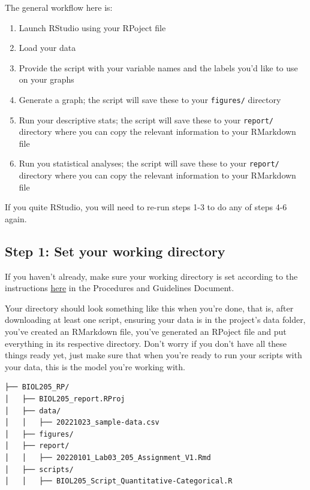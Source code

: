 \documentclass[
]{book}
\providecommand{\tightlist}{%
  \setlength{\itemsep}{0pt}\setlength{\parskip}{0pt}}
\begin{document}
The general workflow here is:

\begin{enumerate}
\def\labelenumi{\arabic{enumi}.}
\tightlist
\item
  Launch RStudio using your RPoject file
\item
  Load your data
\item
  Provide the script with your variable names and the labels you'd like to use on your graphs
\item
  Generate a graph; the script will save these to your \texttt{figures/} directory
\item
  Run your descriptive stats; the script will save these to your \texttt{report/} directory where you can copy the relevant information to your RMarkdown file
\item
  Run you statistical analyses; the script will save these to your \texttt{report/} directory where you can copy the relevant information to your RMarkdown file
\end{enumerate}

If you quite RStudio, you will need to re-run steps 1-3 to do any of steps 4-6 again.

\hypertarget{step-1-set-your-working-directory}{%
\subsection*{Step 1: Set your working directory}\label{step-1-set-your-working-directory}}

If you haven't already, make sure your working directory is set according to the instructions \href{https://ubco-biology.github.io/Procedures-and-Guidelines/set-a-working-directory-in-rstudio.html}{here} in the Procedures and Guidelines Document.

Your directory should look something like this when you're done, that is, after downloading at least one script, ensuring your data is in the project's data folder, you've created an RMarkdown file, you've generated an RPoject file and put everything in its respective directory. Don't worry if you don't have all these things ready yet, just make sure that when you're ready to run your scripts with your data, this is the model you're working with.

\begin{verbatim}
├── BIOL205_RP/
│   ├── BIOL205_report.RProj
│   ├── data/
│   │   ├── 20221023_sample-data.csv
│   ├── figures/
│   ├── report/
│   │   ├── 20220101_Lab03_205_Assignment_V1.Rmd
│   ├── scripts/
│   │   ├── BIOL205_Script_Quantitative-Categorical.R
\end{verbatim}
\end{document}
